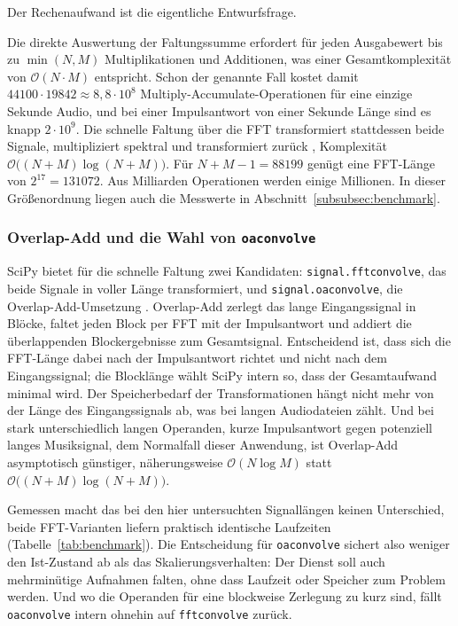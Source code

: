 Der Rechenaufwand ist die eigentliche Entwurfsfrage.

Die direkte Auswertung der Faltungssumme erfordert für jeden Ausgabewert bis zu $\min(N,M)$ Multiplikationen und Additionen,
was einer Gesamtkomplexität von $\mathcal{O}(N \cdot M)$ entspricht.
Schon der genannte Fall kostet damit
$44100 \cdot 19842 \approx 8{,}8 \cdot 10^{8}$
Multiply-Accumulate-Operationen für eine einzige Sekunde Audio, und bei einer
Impulsantwort von einer Sekunde Länge sind es knapp $2 \cdot 10^{9}$. Die
schnelle Faltung über die FFT transformiert stattdessen beide Signale,
multipliziert spektral und transformiert zurück \parencite{oppenheim2010},
Komplexität $\mathcal{O}\bigl((N + M)\log(N + M)\bigr)$. Für
$N + M - 1 = 88199$ genügt eine FFT-Länge von $2^{17} = 131072$. Aus Milliarden
Operationen werden einige Millionen. In dieser Größenordnung liegen auch die
Messwerte in Abschnitt~\ref{subsubsec:benchmark}.

\subsubsection{Overlap-Add und die Wahl von \texttt{oaconvolve}}
\label{subsubsec:oa}

SciPy bietet für die schnelle Faltung zwei Kandidaten:
\texttt{signal.fftconvolve}, das beide Signale in voller Länge transformiert,
und \texttt{signal.oaconvolve}, die Overlap-Add-Umsetzung
\parencite{oppenheim2010,virtanen2020}. Overlap-Add zerlegt das lange
Eingangssignal in Blöcke, faltet jeden Block per FFT mit der Impulsantwort und
addiert die überlappenden Blockergebnisse zum Gesamtsignal. Entscheidend ist,
dass sich die FFT-Länge dabei nach der Impulsantwort richtet und nicht nach dem
Eingangssignal; die Blocklänge wählt SciPy intern so, dass der Gesamtaufwand
minimal wird.
Der Speicherbedarf der Transformationen hängt nicht mehr von der Länge des Eingangssignals ab, was
bei langen Audiodateien zählt.
Und bei stark unterschiedlich langen Operanden, kurze Impulsantwort gegen potenziell langes Musiksignal, dem Normalfall dieser
Anwendung, ist Overlap-Add asymptotisch günstiger, näherungsweise
$\mathcal{O}(N \log M)$ statt $\mathcal{O}\bigl((N+M)\log(N+M)\bigr)$.

Gemessen macht das bei den hier untersuchten Signallängen keinen Unterschied,
beide FFT-Varianten liefern praktisch identische Laufzeiten
(Tabelle~\ref{tab:benchmark}). Die Entscheidung für \texttt{oaconvolve}
sichert also weniger den Ist-Zustand ab als das Skalierungsverhalten: Der
Dienst soll auch mehrminütige Aufnahmen falten, ohne dass Laufzeit oder
Speicher zum Problem werden. Und wo die Operanden für eine blockweise
Zerlegung zu kurz sind, fällt \texttt{oaconvolve} intern ohnehin auf
\texttt{fftconvolve} zurück.

